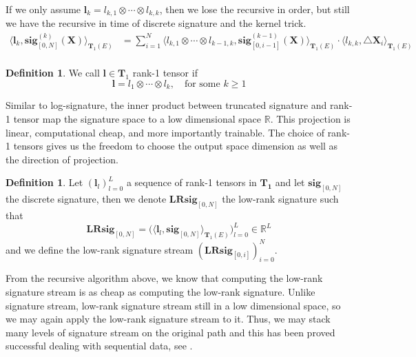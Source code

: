 \documentclass[12pt]{report}
\theoremstyle{definition}
\newtheorem{definition}[theorem]{Definition}
\theoremstyle{remark}
\newcommand{\R}{\mathbb{R}}
\begin{document}
  If we only assume $\mathbf{l}_{k} = l_{k,1} \otimes \cdots \otimes l_{k,k}$, then we lose the recursive in order, but still we have the recursive in time of discrete signature and the kernel trick.
    \begin{equation}
    \begin{split}
     \langle \mathbf{l}_{k}, \mathbf{sig}^{(k)}_{[0,N]}(\mathbf{X}) \rangle_{\mathbf{T}_{1}(E)} &= \sum_{i=1}^{N} \langle l_{k,1} \otimes \cdots \otimes l_{k-1,k} ,\mathbf{sig}^{(k-1)}_{[0,i-1]}(\mathbf{X})\rangle_{\mathbf{T}_{1}(E)}\cdot\langle l_{k,k},\triangle \mathbf{X}_{i}\rangle_{\mathbf{T}_{1}(E)} \\
    \end{split}
  \end{equation}
  
  \begin{definition}
    We call $\mathbf{l}  \in \mathbf{T}_{1}$ rank-1 tensor if
    \begin{equation}
      \mathbf{l} = l_{1} \otimes \cdots \otimes l_{k},\quad \text{for some  }k \geq 1
    \end{equation}
  \end{definition}
  Similar to log-signature, the inner product between truncated signature and rank-1 tensor map the signature space to a low dimensional space $\R$. This projection is linear, computational cheap, and more importantly trainable. The choice of rank-1 tensors gives us the freedom to choose the output space dimension as well as the direction of projection.
  \begin{definition}
    Let $(\mathbf{l}_{l})_{l=0}^{L}$ a sequence of rank-1 tensors in $\mathbf{T_{1}}$ and let $\mathbf{sig}_{[0,N]}$ the discrete signature, then we denote $\mathbf{LRsig}_{[0,N]}$ the low-rank signature such that 
  \begin{equation}
    \mathbf{LRsig}_{[0,N]} = \big(\langle \mathbf{l}_{l} , \mathbf{sig}_{[0,N]} \rangle_{\mathbf{T}_{1}(E)}\big)_{l=0}^{L} \in \R^{L}
  \end{equation} 
  and we define the low-rank signature stream $(\mathbf{LRsig}_{[0,i]})_{i=0}^{N}$.
  \end{definition}
  From the recursive algorithm above, we know that computing the low-rank signature stream is as cheap as computing the low-rank signature. Unlike signature stream, low-rank signature stream still in a low dimensional space, so we may again apply the low-rank signature stream to it. Thus, we may stack many levels of signature stream on the original path and this has been proved successful dealing with sequential data, see \cite{toth2020seq2tens}.
\end{document}
